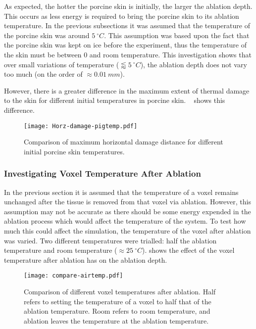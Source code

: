 As expected, the hotter the porcine skin is initially, the larger the ablation depth.
This occurs as less energy is required to bring the porcine skin to its ablation temperature.
In the previous subsections it was assumed that the temperature of the porcine skin was around $5~^{\circ}C$.
This assumption was based upon the fact that the porcine skin was kept on ice before the experiment, thus the temperature of the skin must be between 0 and room temperature.
This investigation shows that over small variations of temperature ($\lessapprox 5~^{\circ}C$), the ablation depth does not vary too much (on the order of $\approx 0.01~mm$).

However, there is a greater difference in the maximum extent of thermal damage to the skin for different initial temperatures in porcine skin.
~ shows this difference.


\begin{figure}[!htbp]
	\centering
	\texttt{[image: Horz-damage-pigtemp.pdf]}
	\caption{Comparison of maximum horizontal damage distance for different initial porcine skin temperatures.}
	\label{fig:horzdamagepig}
\end{figure}

\subsubsection*{Investigating Voxel Temperature After Ablation}

In the previous section it is assumed that the temperature of a voxel remains unchanged after the tissue is removed from that voxel via ablation.
However, this assumption may not be accurate as there should be some energy expended in the ablation process which would affect the temperature of the system.
To test how much this could affect the simulation, the temperature of the voxel after ablation was varied.
Two different temperatures were trialled: half the ablation temperature and room temperature ($\approx 25~^{\circ}C$).
 shows the effect of the voxel temperature after ablation has on the ablation depth.

\begin{figure}[!htbp]
	\centering
	\texttt{[image: compare-airtemp.pdf]}
	\caption{Comparison of different voxel temperatures after ablation. Half refers to setting the temperature of a voxel to half that of the ablation temperature. Room refers to room temperature, and ablation leaves the temperature at the ablation temperature.}
	\label{fig:comparevoxtemp}
\end{figure}


